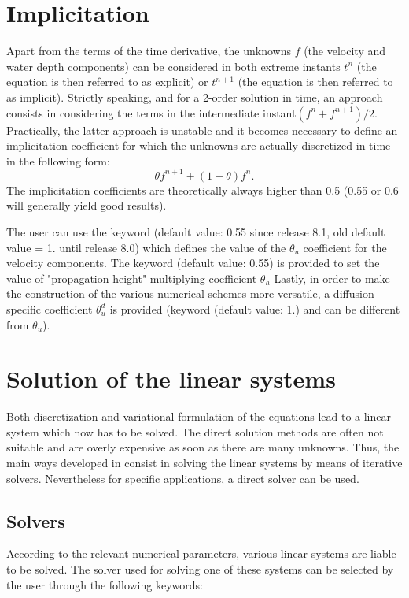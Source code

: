 \section{Implicitation}

Apart from the terms of the time derivative, the unknowns $f$ (the velocity and
water depth components) can be considered in both extreme instants $t^{n}$ (the
equation is then referred to as explicit) or $t^{n+1}$ (the equation is then
referred to as implicit). Strictly speaking, and for a 2-order solution in
time, an approach consists in considering the terms in the intermediate
instant$(f^{n} +f^{n+1})/2$. Practically, the latter approach is unstable and
it becomes necessary to define an implicitation coefficient for which the
unknowns are actually discretized in time in the following form:
\[\theta f^{n+1} +(1-\theta )f^{n} .\]
The implicitation coefficients are theoretically always higher than 0.5 (0.55
or 0.6 will generally yield good results).

The user can use the keyword  (default
value: 0.55 since release 8.1, old default value = 1. until release 8.0)
which defines the value of the $\theta_{u}$ coefficient for the
velocity components. The keyword  (default
value: 0.55) is provided to set the value of "propagation height" multiplying
coefficient $\theta_{h}$ Lastly, in order to make the construction of the
various numerical schemes more versatile, a diffusion-specific coefficient
$\theta_{u}^{d}$ is provided (keyword 
(default value: 1.) and can be different from $\theta_{u}$).


\section{Solution of the linear systems}

Both discretization and variational formulation of the equations lead to a
linear system which now has to be solved. The direct solution methods are often
not suitable and are overly expensive as soon as there are many unknowns.
Thus, the main ways developed in  consist in solving the linear
systems by means of iterative solvers. Nevertheless for specific applications,
a direct solver can be used.


\subsection{Solvers}
\label{sec:solver}
According to the relevant numerical parameters, various linear systems are
liable to be solved. The solver used for solving one of these systems can be
selected by the user through the following keywords:


